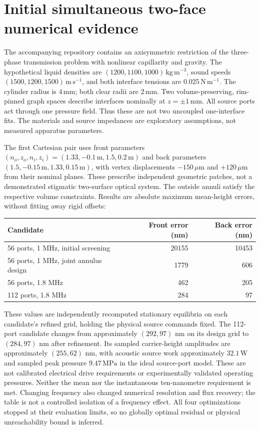 \section{Initial simultaneous two-face numerical evidence}
\label{sec:dual-evidence}
The accompanying repository contains an axisymmetric restriction of the
three-phase transmission problem with nonlinear capillarity and gravity.
The hypothetical liquid densities are $(1200,1100,1000)\,\mathrm{kg\,m^{-3}}$,
sound speeds $(1500,1200,1500)\,\mathrm{m\,s^{-1}}$, and both interface tensions
are $0.025\,\mathrm{N\,m^{-1}}$. The cylinder radius is $4\,\mathrm{mm}$;
both clear radii are $2\,\mathrm{mm}$. Two volume-preserving, rim-pinned graph
spaces describe interfaces nominally at $z=\pm1\,\mathrm{mm}$.
All source ports act through one pressure field. Thus these are not two
uncoupled one-interface fits. The materials and source impedances are
exploratory assumptions, not measured apparatus parameters.

The first Cartesian pair uses front parameters
$(n_o,z_o,n_i,z_i)=(1.33,-0.1\,\mathrm m,1.5,0.2\,\mathrm m)$ and back parameters
$(1.5,-0.15\,\mathrm m,1.33,0.15\,\mathrm m)$, with vertex displacements
$-150\,\mu\mathrm m$ and $+120\,\mu\mathrm m$ from their nominal planes.
These prescribe independent geometric patches, not a demonstrated stigmatic
two-surface optical system. The outside annuli satisfy the respective volume
constraints. Results are absolute maximum mean-height errors, without fitting
away rigid offsets:
\begin{center}
\begin{tabular}{lrr}
\toprule
Candidate & Front error (nm) & Back error (nm)\\
\midrule
56 ports, 1 MHz, initial screening & 20155 & 10453\\
56 ports, 1 MHz, joint annulus design & 1779 & 606\\
56 ports, 1.8 MHz & 462 & 205\\
112 ports, 1.8 MHz & 284 & 97\\
\bottomrule
\end{tabular}
\end{center}
These values are independently recomputed stationary equilibria on each
candidate's refined grid, holding the physical source commands fixed.
The 112-port candidate changes from approximately $(292,97)$ nm on its design
grid to $(284,97)$ nm after refinement. Its sampled carrier-height amplitudes
are approximately $(255,62)$ nm, with acoustic source work approximately
$32.1\,\mathrm W$ and sampled peak pressure $9.47\,\mathrm{MPa}$ in the
ideal source-port model. These are not calibrated electrical drive requirements
or experimentally validated operating pressures. Neither the mean nor the instantaneous
ten-nanometre requirement is met. Changing frequency also changed numerical
resolution and flux recovery; the table is not a controlled isolation of a
frequency effect. All four optimizations stopped at their evaluation limits,
so no globally optimal residual or physical unreachability bound is inferred.

